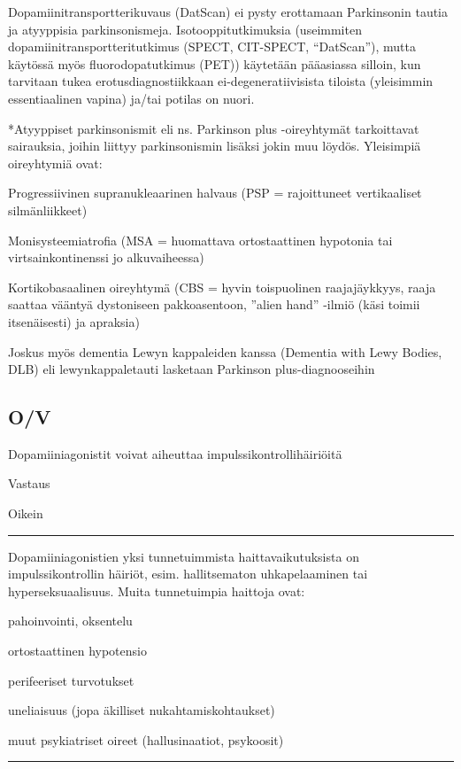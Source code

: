 \documentclass[
]{book}
\begin{document}
Dopamiinitransportterikuvaus (DatScan) ei pysty erottamaan Parkinsonin tautia ja atyyppisia parkinsonismeja. Isotooppitutkimuksia (useimmiten dopamiinitransportteritutkimus (SPECT, CIT-SPECT, ``DatScan''), mutta käytössä myös fluorodopatutkimus (PET)) käytetään pääasiassa silloin, kun tarvitaan tukea erotusdiagnostiikkaan ei-degeneratiivisista tiloista (yleisimmin essentiaalinen vapina) ja/tai potilas on nuori.

*Atyyppiset parkinsonismit eli ns. Parkinson plus -oireyhtymät tarkoittavat sairauksia, joihin liittyy parkinsonismin lisäksi jokin muu löydös. Yleisimpiä oireyhtymiä ovat:

Progressiivinen supranukleaarinen halvaus (PSP = rajoittuneet vertikaaliset silmänliikkeet)

Monisysteemiatrofia (MSA = huomattava ortostaattinen hypotonia tai virtsainkontinenssi jo alkuvaiheessa)

Kortikobasaalinen oireyhtymä (CBS = hyvin toispuolinen raajajäykkyys, raaja saattaa vääntyä dystoniseen pakkoasentoon, ''alien hand'' -ilmiö (käsi toimii itsenäisesti) ja apraksia)

Joskus myös dementia Lewyn kappaleiden kanssa (Dementia with Lewy Bodies, DLB) eli lewynkappaletauti lasketaan Parkinson plus-diagnooseihin

\subsection{O/V}\label{ov-14}

Dopamiiniagonistit voivat aiheuttaa impulssikontrollihäiriöitä

Vastaus

Oikein

\begin{center}\rule{0.5\linewidth}{0.5pt}\end{center}

Dopamiiniagonistien yksi tunnetuimmista haittavaikutuksista on impulssikontrollin häiriöt, esim. hallitsematon uhkapelaaminen tai hyperseksuaalisuus. Muita tunnetuimpia haittoja ovat:

pahoinvointi, oksentelu

ortostaattinen hypotensio

perifeeriset turvotukset

uneliaisuus (jopa äkilliset nukahtamiskohtaukset)

muut psykiatriset oireet (hallusinaatiot, psykoosit)

\begin{center}\rule{0.5\linewidth}{0.5pt}\end{center}
\end{document}

